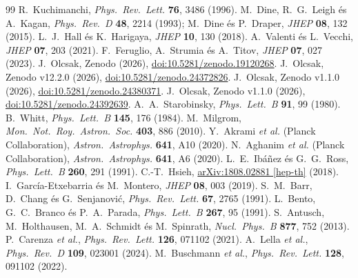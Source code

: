 \documentclass[11pt,a4paper]{article}
\begin{document}
\begin{thebibliography}{99}
 R.~Kuchimanchi, \emph{Phys.\ Rev.\ Lett.} \textbf{76}, 3486 (1996).
 M.~Dine, R.~G.~Leigh és A.~Kagan, \emph{Phys.\ Rev.\ D} \textbf{48}, 2214 (1993); M.~Dine és P.~Draper, \emph{JHEP} \textbf{08}, 132 (2015).
 L.~J.~Hall és K.~Harigaya, \emph{JHEP} \textbf{10}, 130 (2018).
 A.~Valenti és L.~Vecchi, \emph{JHEP} \textbf{07}, 203 (2021).
 F.~Feruglio, A.~Strumia és A.~Titov, \emph{JHEP} \textbf{07}, 027 (2023).
 J.~Olcsak, Zenodo (2026), \href{https://doi.org/10.5281/zenodo.19120268}{doi:10.5281/zenodo.19120268}.
 J.~Olcsak, Zenodo v12.2.0 (2026), \href{https://doi.org/10.5281/zenodo.24372826}{doi:10.5281/zenodo.24372826}.
 J.~Olcsak, Zenodo v1.1.0 (2026), \href{https://doi.org/10.5281/zenodo.24380371}{doi:10.5281/zenodo.24380371}.
 J.~Olcsak, Zenodo v1.1.0 (2026), \href{https://doi.org/10.5281/zenodo.24392639}{doi:10.5281/zenodo.24392639}.
 A.~A.~Starobinsky, \emph{Phys.\ Lett.\ B} \textbf{91}, 99 (1980).
 B.~Whitt, \emph{Phys.\ Lett.\ B} \textbf{145}, 176 (1984).
 M.~Milgrom, \emph{Mon.\ Not.\ Roy.\ Astron.\ Soc.} \textbf{403}, 886 (2010).
 Y.~Akrami \textit{et al.} (Planck Collaboration), \emph{Astron.\ Astrophys.} \textbf{641}, A10 (2020).
 N.~Aghanim \textit{et al.} (Planck Collaboration), \emph{Astron.\ Astrophys.} \textbf{641}, A6 (2020).
 L.~E.~Ibáñez és G.~G.~Ross, \emph{Phys.\ Lett.\ B} \textbf{260}, 291 (1991).
 C.-T.~Hsieh, \href{https://arxiv.org/abs/1808.02881}{arXiv:1808.02881 [hep-th]} (2018).
 I.~García-Etxebarria és M.~Montero, \emph{JHEP} \textbf{08}, 003 (2019).
 S.~M.~Barr, D.~Chang és G.~Senjanović, \emph{Phys.\ Rev.\ Lett.} \textbf{67}, 2765 (1991).
 L.~Bento, G.~C.~Branco és P.~A.~Parada, \emph{Phys.\ Lett.\ B} \textbf{267}, 95 (1991).
 S.~Antusch, M.~Holthausen, M.~A.~Schmidt és M.~Spinrath, \emph{Nucl.\ Phys.\ B} \textbf{877}, 752 (2013).
 P.~Carenza \textit{et al.}, \emph{Phys.\ Rev.\ Lett.} \textbf{126}, 071102 (2021).
 A.~Lella \textit{et al.}, \emph{Phys.\ Rev.\ D} \textbf{109}, 023001 (2024).
 M.~Buschmann \textit{et al.}, \emph{Phys.\ Rev.\ Lett.} \textbf{128}, 091102 (2022).

\end{thebibliography}
\end{document}
